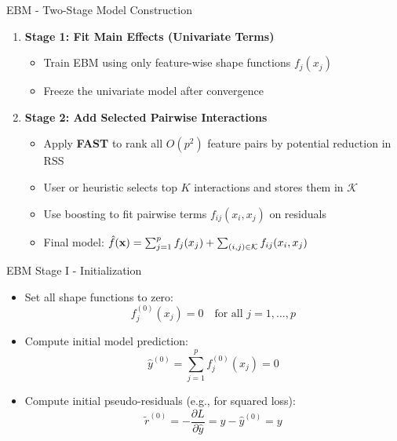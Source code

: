 \documentclass[11pt,compress,t,notes=noshow, aspectratio=169, xcolor=table]{beamer}
\begin{document}
\begin{frame}{EBM - Two-Stage Model Construction}
\begin{enumerate}
    \item \textbf{Stage 1: Fit Main Effects (Univariate Terms)}
    \begin{itemize}
        \item Train EBM using only feature-wise shape functions $f_j(x_j)$
        \item Freeze the univariate model after convergence
    \end{itemize}
    
    \item \textbf{Stage 2: Add Selected Pairwise Interactions}
    \begin{itemize}
        \item Apply \textbf{FAST} to rank all $O(p^2)$ feature pairs by potential reduction in RSS
        \item User or heuristic selects top $K$ interactions and stores them in $\mathcal{K}$
        \item Use boosting to fit pairwise terms $f_{ij}(x_i, x_j)$ on residuals
        \item Final model: $\hat{f}(\mathbf{x}) = \sum_{j=1}^p f_j(x_j) + \sum_{(i,j)\in\mathcal{K}} f_{ij}(x_i, x_j)$
    \end{itemize}
\end{enumerate}

\end{frame}



\begin{frame}{EBM Stage I - Initialization}

\begin{itemize}
    \item Set all shape functions to zero:
    $$
    f_j^{(0)}(x_j) = 0 \quad \text{for all } j = 1, \dots, p
    $$
    \item Compute initial model prediction:
    $$
    \hat{y}^{(0)} = \sum_{j=1}^p f_j^{(0)}(x_j) = 0
    $$
    \item Compute initial pseudo-residuals (e.g., for squared loss):
    $$
    \tilde{r}^{(0)} = -\frac{\partial L}{\partial \hat{y}} = y - \hat{y}^{(0)} = y
    $$
\end{itemize}

\end{frame}
\end{document}
